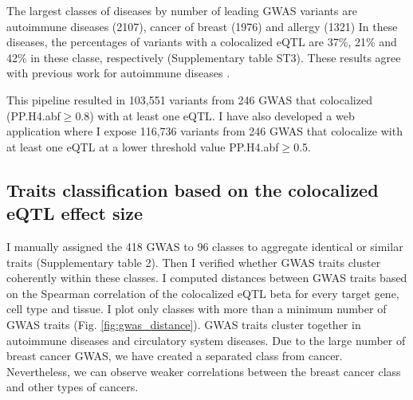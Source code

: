 The largest classes of diseases by number of leading GWAS variants are autoimmune diseases (2107), cancer of breast (1976) and allergy (1321)
%
In these diseases, the percentages of variants with a colocalized eQTL are 37\%, 21\% and 42\% in these classe, respectively (Supplementary table ST3).
%
%
These results agree with previous work for autoimmune diseases \citep{2021.Li.Mu}.

This pipeline resulted in 103,551 variants from 246 GWAS that colocalized (PP.H4.abf$\geq$0.8) with at least one eQTL.
%
I have also developed a web application where I expose 116,736 variants from 246 GWAS that colocalize with at least one eQTL at a lower threshold value PP.H4.abf$\geq$0.5.


\subsection*{Traits classification based on the colocalized eQTL effect size}

I manually assigned the 418 GWAS to 96 classes to aggregate identical or similar traits (Supplementary table 2).
%
Then I verified whether GWAS traits cluster coherently within these classes.
%
I computed distances between GWAS traits based on the Spearman correlation of the colocalized eQTL beta for every target gene, cell type and tissue.
%
I plot only classes with more than a minimum number of GWAS traits (Fig. \ref{fig:gwas_distance}).
%
GWAS traits cluster together in autoimmune diseases and circulatory system diseases.
%
Due to the large number of breast cancer GWAS, we have created a separated class from cancer.
Nevertheless, we can observe weaker correlations between the breast cancer class and other types of cancers.

